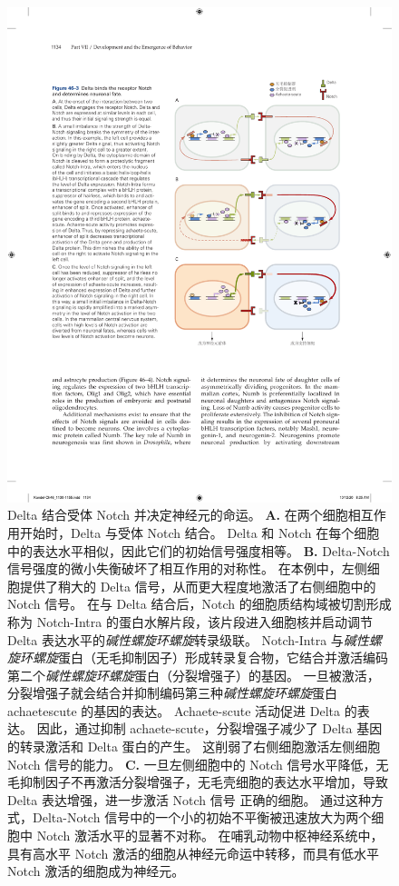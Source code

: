 \begin{figure}[htbp]
	\centering
	\includegraphics[width=0.75\linewidth]{chap46/fig_46_3}
	\caption{Delta 结合受体 Notch 并决定神经元的命运。
		\textbf{A.} 在两个细胞相互作用开始时，Delta 与受体 Notch 结合。
		Delta 和 Notch 在每个细胞中的表达水平相似，因此它们的初始信号强度相等。
		\textbf{B.} Delta-Notch 信号强度的微小失衡破坏了相互作用的对称性。
		在本例中，左侧细胞提供了稍大的 Delta 信号，从而更大程度地激活了右侧细胞中的 Notch 信号。
		在与 Delta 结合后，Notch 的细胞质结构域被切割形成称为 Notch-Intra 的蛋白水解片段，该片段进入细胞核并启动调节 Delta 表达水平的\textit{碱性螺旋环螺旋}转录级联。
		Notch-Intra 与\textit{碱性螺旋环螺旋}蛋白（无毛抑制因子）形成转录复合物，它结合并激活编码第二个\textit{碱性螺旋环螺旋}蛋白（分裂增强子）的基因。
		一旦被激活，分裂增强子就会结合并抑制编码第三种\textit{碱性螺旋环螺旋}蛋白 achaetescute 的基因的表达。
		Achaete-scute 活动促进 Delta 的表达。
		因此，通过抑制 achaete-scute，分裂增强子减少了 Delta 基因的转录激活和 Delta 蛋白的产生。
		这削弱了右侧细胞激活左侧细胞 Notch 信号的能力。
		\textbf{C.} 一旦左侧细胞中的 Notch 信号水平降低，无毛抑制因子不再激活分裂增强子，无毛壳细胞的表达水平增加，导致 Delta 表达增强，进一步激活 Notch 信号 正确的细胞。
		通过这种方式，Delta-Notch 信号中的一个小的初始不平衡被迅速放大为两个细胞中 Notch 激活水平的显著不对称。
		在哺乳动物中枢神经系统中，具有高水平 Notch 激活的细胞从神经元命运中转移，而具有低水平 Notch 激活的细胞成为神经元。}
	\label{fig:46_3}
\end{figure}


